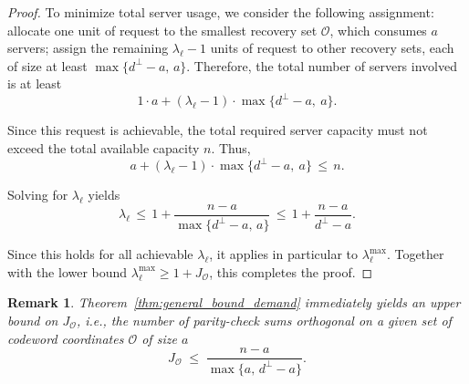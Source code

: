 \documentclass[conference,letterpaper]{IEEEtran}
\newtheorem{remark}{Remark}
\begin{document}
\begin{proof}
To minimize total server usage, we consider the following assignment: allocate one unit of request to the smallest recovery set \( \mathcal{O} \), which consumes \( a \) servers; assign the remaining \( \lambda_{\ell} - 1 \) units of request to other recovery sets, each of size at least \( \max\{d^\perp - a,\, a\} \). Therefore, the total number of servers involved is at least
\[
1\cdot a + (\lambda_{\ell} - 1)\cdot\max\{d^\perp - a,\ a\}.
\]

Since this request is achievable, the total required server capacity must not exceed the total available capacity \( n \). Thus,
\[
a + (\lambda_{\ell} - 1)\cdot\max\{d^\perp - a,\ a\} \,\le\, n.
\]

Solving for \( \lambda_{\ell} \) yields
\[
\lambda_{\ell} \,\le\, 1 + \frac{n - a}{\max\{d^\perp - a,\, a\}} \,\le\, 1 + \frac{n - a}{d^\perp - a}.
\]

Since this holds for all achievable \( \lambda_{\ell} \), it applies in particular to \( \lambda_{\ell}^{\max} \). Together with the lower bound \( \lambda_{\ell}^{\max} \ge 1 + J_{\mathcal{O}} \), this completes the proof.
\end{proof}

\begin{remark}
Theorem~\ref{thm:general_bound_demand} immediately yields an upper bound on \( J_{\mathcal{O}} \), i.e., the number of parity-check sums orthogonal on a given set of codeword coordinates \( \mathcal{O} \) of size \( a \)
\[
   J_{\mathcal{O}} \;\le\; \frac{n - a}{\max\{a, \, d^{\perp} - a\}}.
\]
\end{remark}
\end{document}
